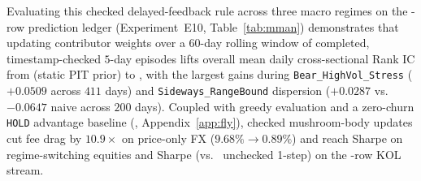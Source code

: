 \begin{table}[t]
\centering
{}
\vspace{-0.15cm}
\caption{Checked delayed-feedback calibration across three market regimes on the \KOLPredRows{}-row ledger (Experiment~E10, \texttt{EXTENDED\_ABLATIONS\_E9\_E12\_RESULTS.json}). Updating memory weights via 60-day rolling realized episodes ($t-5\text{d}$ checked settlement) outperforms both naive aggregation and static PIT priors.}
\label{tab:mman}
\vspace{-0.22cm}
\end{table}

Evaluating this checked delayed-feedback rule across three macro regimes on the \KOLPredRows{}-row prediction ledger (Experiment~E10, Table~\ref{tab:mman}) demonstrates that updating contributor weights over a 60-day rolling window of completed, timestamp-checked $5$-day episodes lifts overall mean daily cross-sectional Rank IC from \textbf{\KOLGatedDailyIC{}} (static PIT prior) to \textbf{\KOLRollingDailyIC{}}, with the largest gains during \texttt{Bear\_HighVol\_Stress} ($+0.0509$ across $411$ days) and \texttt{Sideways\_RangeBound} dispersion ($+0.0287$ vs.\ $-0.0647$ naive across $200$ days). Coupled with greedy evaluation and a zero-churn \texttt{HOLD} advantage baseline (, Appendix~\ref{app:fly}), checked mushroom-body updates cut fee drag by $10.9\times$ on price-only FX ($9.68\% \to 0.89\%$) and reach \textbf{\FlySynCheckedSharpe{}} Sharpe on regime-switching equities and \textbf{\FlyKOLCheckedSharpe{}} Sharpe (vs.\ \textbf{\FlyKOLUncheckedSharpe{}} unchecked 1-step) on the \KOLPredRows{}-row KOL stream.


